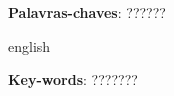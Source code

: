 \documentclass[
    12pt,       %
    oneside,    %
    a4paper,    %
%
    chapter=TITLE,	  	  %
%
    english,			  %
    brazil				  %
%
]{abntex2}
\begin{document}
\setlength{\absparsep}{18pt} %

\begin{resumo}
  \textcolor{red}{\lipsum[2]} %

 \vspace{\onelineskip}

 \noindent
 \textbf{Palavras-chaves}: ??????%
\end{resumo}


\begin{resumo}[Abstract]
 \begin{otherlanguage*}{english}
   \textcolor{red}{\lipsum[3]} %

   \vspace{\onelineskip}

   \noindent
   \textbf{Key-words}: ???????%
 \end{otherlanguage*}
\end{resumo}


\listoffigures*
\cleardoublepage{}

\listoftables*
\cleardoublepage{}
\end{document}

